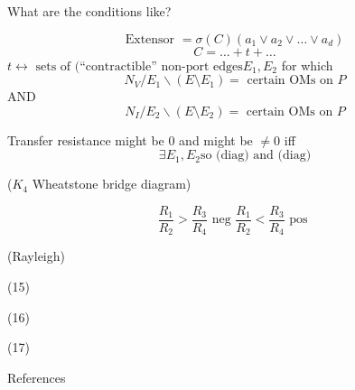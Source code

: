 \documentclass{beamer}
\begin{document}
\begin{frame}{What are the conditions like?}

\[
\text{Extensor\ }= \sigma(C)(a_1\vee a_2\vee \ldots \vee a_d)
\]
\[
C = \ldots + t + \ldots
\]
$t \leftrightarrow \text{\ sets of (``contractible'' non-port edges} 
E_1, E_2$ for which
\[
N_V/E_1\backslash(E\setminus E_1) = \text{\ certain OMs on\ } P
\]
AND
\[
N_I/E_2\backslash(E\setminus E_2) = \text{\ certain OMs on\ } P
\]

Transfer resistance might be 0 and might be $\neq 0$ iff
\[
\exists E_1, E_2 \text{so (diag) and (diag)}
\]

($K_4$ Wheatstone bridge diagram)

\[
\frac{R_1}{R_2} > \frac{R_3}{R_4} 
\text{\ neg\ }
\frac{R_1}{R_2} < \frac{R_3}{R_4} 
\text{\ pos\ }
\]

\end{frame}

\begin{frame}{(Rayleigh)}
\end{frame}

\begin{frame}{(15)}
\end{frame}

\begin{frame}{(16)}
\end{frame}

\begin{frame}{(17)}
\end{frame}


\begin{frame}[allowframebreaks]{References}

{}
\end{frame}
\end{document}
